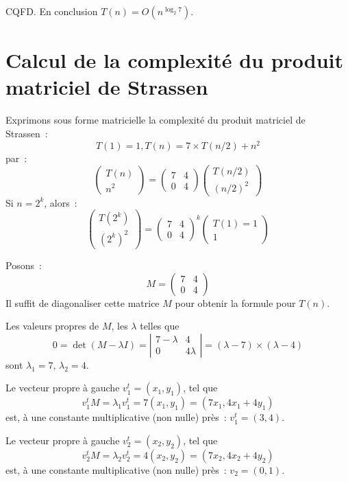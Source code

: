 \documentclass[a4paper]{article}
\begin{document}
\noindent CQFD. En conclusion
$T(n)=O(n^{\log_2 7})$. 

\section{Calcul de la complexité du produit matriciel de Strassen}
Exprimons sous forme matricielle la complexité du produit matriciel de Strassen~:
$$ T(1)=1, T(n)=7\times T(n/2) + n^2$$
par~:
$$
\left(\begin{array}{c}
T(n)\\
n^ 2
\end{array}\right)=
\left(\begin{array}{cc}
7 & 4 \\
0 & 4
\end{array}\right)\left(\begin{array}{c}
T(n/2) \\
(n/2)^2\end{array}\right)$$
Si $n=2^k$, alors~:
$$
\left(\begin{array}{c}
T(2^k) \\
(2^k)^2
\end{array}\right)=
\left(\begin{array}{cc}
7 & 4 \\
0 & 4
\end{array}\right)^k\left(\begin{array}{c}
T(1)=1 \\
1 \end{array}\right)$$ 

Posons~: 
$$
M=\left(\begin{array}{cc}
7 & 4 \\
0 & 4
\end{array}\right)$$
Il suffit de diagonaliser cette matrice $M$ pour obtenir la formule pour $T(n)$.

Les valeurs propres de $M$, les $\lambda$ telles que 
$$0=\det(M-\lambda I)= 
\left|\begin{array}{cc}
7 - \lambda & 4 \\
0 & 4  \lambda 
\end{array}\right|=(\lambda-7)\times(\lambda-4)$$ sont $\lambda_1=7$, $\lambda_2=4$.

Le vecteur propre à gauche $v_1^t=(x_1, y_1)$, tel que 
$$v_1^tM=\lambda_1 v_1^t= 7( x_1, y_1)=(7x_1, 4x_1+4y_1)$$
est, à une constante multiplicative (non nulle) près~: $v_1^t=(3, 4)$.

Le vecteur propre à gauche $v_2^t=(x_2, y_2)$, tel que
$$v_2^tM=\lambda_2 v_2^t=4(x_2, y_2)=(7 x_2, 4x_2+4y_2)$$
est, à une constante multiplicative (non nulle) près~: $v_2=(0, 1)$.
\end{document}

